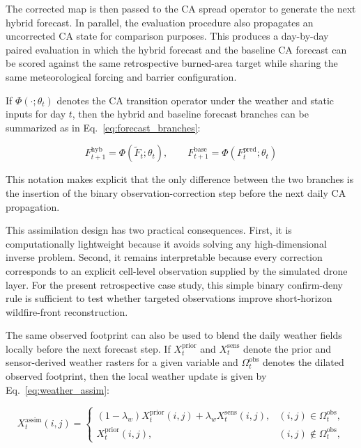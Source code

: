 \documentclass[10pt,letterpaper]{article}
\begin{document}
The corrected map is then passed to the CA spread operator to generate
the next hybrid forecast. In parallel, the evaluation procedure also propagates an
uncorrected CA state for comparison purposes. This produces a day-by-day
paired evaluation in which the hybrid forecast and the baseline CA
forecast can be scored against the same retrospective burned-area target
while sharing the same meteorological forcing and barrier configuration.

If $\Phi(\cdot;\theta_t)$ denotes the CA transition operator under the
weather and static inputs for day $t$, then the hybrid and baseline
forecast branches can be summarized as in Eq.~\ref{eq:forecast_branches}:

\begin{equation}
F_{t+1}^{\mathrm{hyb}}=\Phi\left(\widetilde{F}_t;\theta_t\right),
\qquad
F_{t+1}^{\mathrm{base}}=\Phi\left(F_t^{\mathrm{pred}};\theta_t\right)
\label{eq:forecast_branches}
\end{equation}

This notation makes explicit that the only difference between the two
branches is the insertion of the binary observation-correction step
before the next daily CA propagation.

This assimilation design has two practical consequences. First, it is
computationally lightweight because it avoids solving any
high-dimensional inverse problem. Second, it remains interpretable
because every correction corresponds to an explicit cell-level
observation supplied by the simulated drone layer. For the present
retrospective case study, this simple binary confirm-deny rule is
sufficient to test whether targeted observations improve short-horizon
wildfire-front reconstruction.

The same observed footprint can also be used to
blend the daily weather fields locally before the next forecast step.
If $X_t^{\mathrm{prior}}$ and $X_t^{\mathrm{sens}}$ denote the prior and
sensor-derived weather rasters for a given variable and
$\Omega_t^{\mathrm{obs}}$ denotes the dilated observed footprint, then
the local weather update is given by Eq.~\ref{eq:weather_assim}:

\begin{equation}
X_t^{\mathrm{assim}}(i,j)=
\begin{cases}
(1-\lambda_w)X_t^{\mathrm{prior}}(i,j)+\lambda_w X_t^{\mathrm{sens}}(i,j), & (i,j)\in \Omega_t^{\mathrm{obs}}, \\
X_t^{\mathrm{prior}}(i,j), & (i,j)\notin \Omega_t^{\mathrm{obs}},
\end{cases}
\label{eq:weather_assim}
\end{equation}
\end{document}
